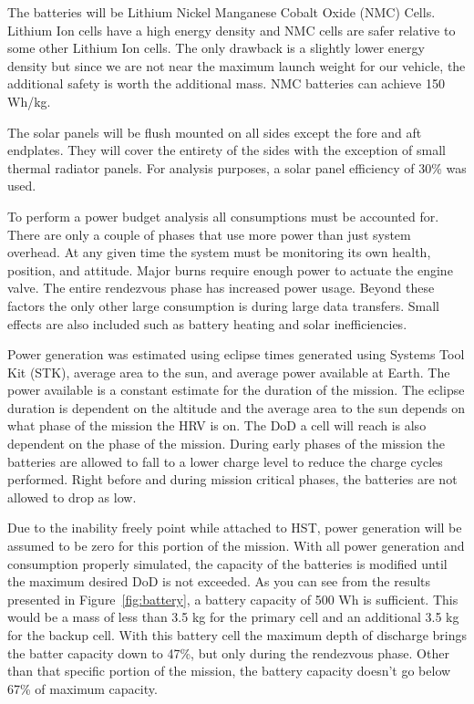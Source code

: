 \documentclass[paper=letter, fontsize=11pt]{scrartcl} %
\numberwithin{equation}{section} %
\numberwithin{figure}{section} %
\numberwithin{table}{section} %
\begin{document}
The batteries will be Lithium Nickel Manganese Cobalt Oxide (NMC) Cells. Lithium Ion cells have a high energy density and NMC cells are safer relative to some other Lithium Ion cells. The only drawback is a slightly lower energy density but since we are not near the maximum launch weight for our vehicle, the additional safety is worth the additional mass. NMC batteries can achieve 150 Wh/kg.

The solar panels will be flush mounted on all sides except the fore and aft endplates. They will cover the entirety of the sides with the exception of small thermal radiator panels. For analysis purposes, a solar panel efficiency of 30\% was used.

To perform a power budget analysis all consumptions must be accounted for. There are only a couple of phases that use more power than just system overhead. At any given time the system must be monitoring its own health, position, and attitude. Major burns require enough power to actuate the engine valve. The entire rendezvous phase has increased power usage. Beyond these factors the only other large consumption is during large data transfers. Small effects are also included such as battery heating and solar inefficiencies.

Power generation was estimated using eclipse times generated using Systems Tool Kit (STK), average area to the sun, and average power available at Earth. The power available is a constant estimate for the duration of the mission. The eclipse duration is dependent on the altitude and the average area to the sun depends on what phase of the mission the HRV is on. The DoD a cell will reach is also dependent on the phase of the mission. During early phases of the mission the batteries are allowed to fall to a lower charge level to reduce the charge cycles performed. Right before and during mission critical phases, the batteries are not allowed to drop as low.

Due to the inability freely point while attached to HST, power generation will be assumed to be zero for this portion of the mission. With all power generation and consumption properly simulated, the capacity of the batteries is modified until the maximum desired DoD is not exceeded. As you can see from the results presented in Figure~\ref{fig:battery}, a battery capacity of 500 Wh is sufficient. This would be a mass of less than 3.5 kg for the primary cell and an additional 3.5 kg for the backup cell. With this battery cell the maximum depth of discharge brings the batter capacity down to 47\%, but only during the rendezvous phase. Other than that specific portion of the mission, the battery capacity doesn't go below 67\% of maximum capacity.
\end{document}
